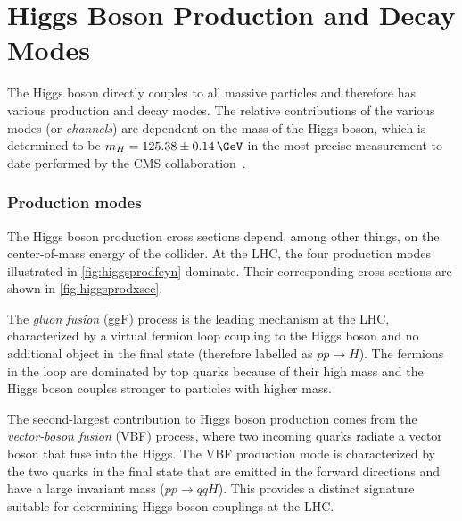 

\section{Higgs Boson Production and Decay Modes}
\label{subsec:higgschannels}
The Higgs boson directly couples to all massive particles and therefore has various production and decay modes.
The relative contributions of the various modes (or \emph{channels}) are dependent on the mass of the Higgs boson, which is determined to be $m_H = 125.38 \pm 0.14\,\GeV$ in the most precise measurement to date performed by the CMS collaboration~\cite{CMS-HIG-19-004}.

\subsubsection{Production modes} 
The Higgs boson production cross sections depend, among other things, on the center-of-mass energy of the collider.
At the LHC, the four production modes illustrated in \cref{fig:higgsprodfeyn} dominate.
Their corresponding cross sections are shown in \cref{fig:higgsprodxsec}.

The \emph{gluon fusion} (ggF) process is the leading mechanism at the LHC, characterized by a virtual fermion loop coupling to the Higgs boson and no additional object in the final state (therefore labelled as $pp\rightarrow H$). 
The fermions in the loop are dominated by top quarks because of their high mass and the Higgs boson couples stronger to particles with higher mass. 

The second-largest contribution to Higgs boson production comes from the \emph{vector-boson fusion} (VBF) process, where two incoming quarks radiate a vector boson that fuse into the Higgs.
The VBF production mode is characterized by the two quarks in the final state that are emitted in the forward directions and have a large invariant mass ($pp\rightarrow qqH$). This provides a distinct signature suitable for determining Higgs boson couplings at the LHC.

